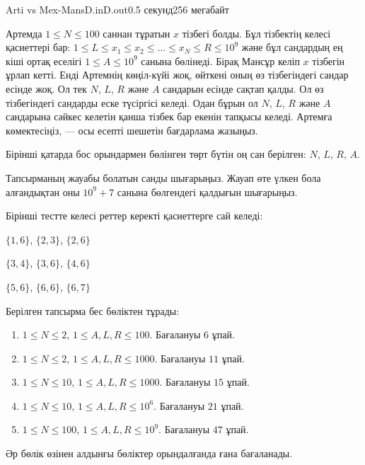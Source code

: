 \begin{problem}{Arti vs Mex-Mans}{D.in}{D.out}{0.5 секунд}{256 мегабайт}

Артемда $1 \le N \le 100$ саннан тұратын $x$ тізбегі болды. Бұл тізбектің келесі қасиеттері бар: $1 \le L \le x_1 \le x_2 \le \ldots \le x_N \le R \le 10^9$ және бұл сандардың ең кіші ортақ еселігі $1 \le A \le 10^9$ санына бөлінеді. Бірақ Мансұр келіп $x$ тізбегін ұрлап кетті. Енді Артемнің көңіл-күйі жоқ, өйткені оның өз тізбегіндегі сандар есінде жоқ. Ол тек $N$, $L$, $R$ және $A$ сандарын есінде сақтап қалды. Ол өз тізбегіндегі сандарды еске түсіргісі келеді. Одан бұрын ол $N$, $L$, $R$ және $A$ сандарына сәйкес келетін қанша тізбек бар екенін тапқысы келеді. Артемға көмектесіңіз, --- осы есепті шешетін бағдарлама жазыңыз.

\InputFile
Бірінші қатарда бос орындармен бөлінген төрт бүтін оң сан берілген: $N$, $L$, $R$, $A$.

\OutputFile
Тапсырманың жауабы болатын санды шығарыңыз. Жауап өте үлкен бола алғандықтан оны $10^9 + 7$ санына бөлгендегі қалдығын шығарыңыз.


\Examples

\begin{example}
%
%
\end{example}


Бірінші тестте келесі реттер керекті қасиеттерге сай келеді:

$\{ 1, 6\}$, $\{ 2, 3\}$, $\{ 2, 6\}$

$\{ 3, 4\}$, $\{ 3, 6\}$, $\{ 4, 6\}$

$\{ 5, 6\}$, $\{ 6, 6\}$, $\{ 6, 7\}$

\Scoring
Берілген тапсырма бес бөліктен тұрады:
\begin{enumerate}
\item $1 \le N \le 2$, $1 \le A,L,R \le 100$. Бағалануы $6$ ұпай.
\item $1 \le N \le 2$, $1 \le A,L,R \le 1000$. Бағалануы $11$ ұпай.
\item $1 \le N \le 10$, $1 \le A,L,R \le 1000$. Бағалануы $15$ ұпай.
\item $1 \le N \le 10$, $1 \le A,L,R \le 10^6$. Бағалануы $21$ ұпай.
\item $1 \le N \le 100$, $1 \le A,L,R \le 10^9$. Бағалануы $47$ ұпай.
\end{enumerate}

Әр бөлік өзінен алдынғы бөліктер орындалғанда ғана бағаланады.


\end{problem}
